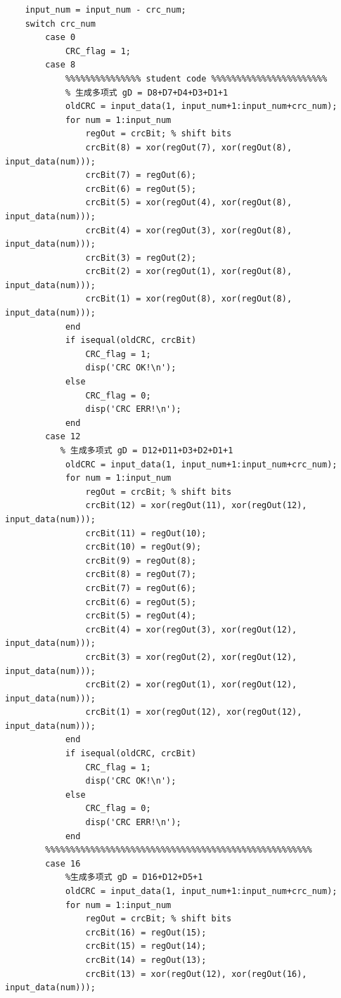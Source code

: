 \documentclass[UTF8]{ctexart}
\begin{document}
\begin{lstlisting}[title=ASK\_DeCRC.m, frame=shadowbox]
    %% 功能实现
    input_num = input_num - crc_num;
    switch crc_num
	    case 0
            CRC_flag = 1;
        case 8
            %%%%%%%%%%%%%%% student code %%%%%%%%%%%%%%%%%%%%%%%
            % 生成多项式 gD = D8+D7+D4+D3+D1+1
            oldCRC = input_data(1, input_num+1:input_num+crc_num);
            for num = 1:input_num
                regOut = crcBit; % shift bits
                crcBit(8) = xor(regOut(7), xor(regOut(8), input_data(num)));
                crcBit(7) = regOut(6);
                crcBit(6) = regOut(5);
                crcBit(5) = xor(regOut(4), xor(regOut(8), input_data(num)));
                crcBit(4) = xor(regOut(3), xor(regOut(8), input_data(num)));
                crcBit(3) = regOut(2);
                crcBit(2) = xor(regOut(1), xor(regOut(8), input_data(num)));
                crcBit(1) = xor(regOut(8), xor(regOut(8), input_data(num)));
            end
            if isequal(oldCRC, crcBit)
                CRC_flag = 1;
                disp('CRC OK!\n');
            else
                CRC_flag = 0;
                disp('CRC ERR!\n');
            end
        case 12
           % 生成多项式 gD = D12+D11+D3+D2+D1+1
            oldCRC = input_data(1, input_num+1:input_num+crc_num);
            for num = 1:input_num
                regOut = crcBit; % shift bits
                crcBit(12) = xor(regOut(11), xor(regOut(12), input_data(num)));
                crcBit(11) = regOut(10);
                crcBit(10) = regOut(9);
                crcBit(9) = regOut(8);
                crcBit(8) = regOut(7);
                crcBit(7) = regOut(6);
                crcBit(6) = regOut(5);
                crcBit(5) = regOut(4);
                crcBit(4) = xor(regOut(3), xor(regOut(12), input_data(num)));
                crcBit(3) = xor(regOut(2), xor(regOut(12), input_data(num)));
                crcBit(2) = xor(regOut(1), xor(regOut(12), input_data(num)));
                crcBit(1) = xor(regOut(12), xor(regOut(12), input_data(num)));
            end
            if isequal(oldCRC, crcBit)
                CRC_flag = 1;
                disp('CRC OK!\n');
            else
                CRC_flag = 0;
                disp('CRC ERR!\n');
            end
        %%%%%%%%%%%%%%%%%%%%%%%%%%%%%%%%%%%%%%%%%%%%%%%%%%%%%    
        case 16 
            %生成多项式 gD = D16+D12+D5+1
            oldCRC = input_data(1, input_num+1:input_num+crc_num);
            for num = 1:input_num
                regOut = crcBit; % shift bits
                crcBit(16) = regOut(15);
                crcBit(15) = regOut(14);
                crcBit(14) = regOut(13);
                crcBit(13) = xor(regOut(12), xor(regOut(16), input_data(num)));

\end{lstlisting}
\end{document}
